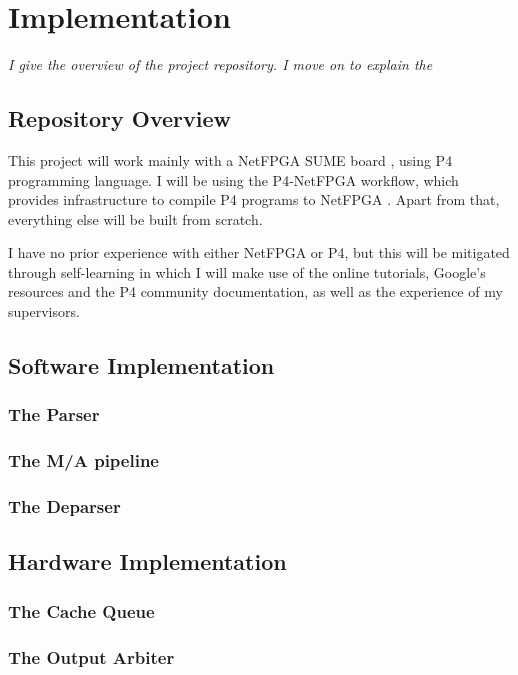 \chapter{Implementation}
\textit{I give the overview of the project repository. I move on to explain the  }

\section{Repository Overview}



This project will work mainly with a NetFPGA SUME board \cite{zilberman2014netfpga}, using P4 programming language. I will be using the P4-NetFPGA workflow, which provides infrastructure to compile P4 programs to NetFPGA \cite{fpga}. Apart from that, everything else will be built from scratch.


I have no prior experience with either NetFPGA or P4, but this will be mitigated through self-learning in which I will make use of the online tutorials, Google's resources and the P4 community documentation, as well as the experience of my supervisors. 
\\

\section{Software Implementation}
	\subsection{The Parser}
	\subsection{The M/A pipeline}
	\subsection{The Deparser} 

\section{Hardware Implementation}
	\subsection{The Cache Queue}
	\subsection{The Output Arbiter}
	
